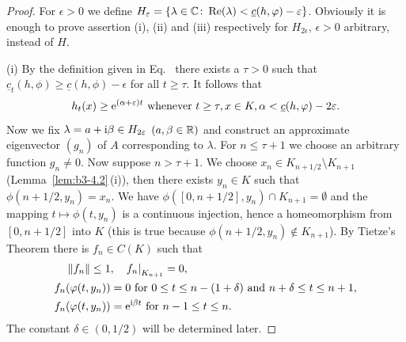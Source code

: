 \begin{proof}
	For $\epsilon > 0$ we define $H_{\epsilon} = \{\lambda \in \C \colon \Re(\lambda) < \underline{c}(h,\phi)-\epsilon\}$.
	Obviously it is enough to prove assertion (i), (ii) and (iii) respectively for $H_{2\epsilon}$, $\epsilon> 0$ arbitrary, instead of\/ $H$.

	(i) By the definition given in Eq.~ there exists a $\tau > 0$ such that $\underline{c}_{t}(h,\phi) \geq \underline{c}(h,\phi) - \epsilon$ for all $t \geq \tau$.
	It follows that
	\begin{equation}\label{eq:b3-4.5}
		h_{t}(x) \geq \eu^{(\alpha + \epsilon)t} \text{ whenever } t \geq \tau, x \in K, \alpha < \underline{c}(h,\phi)-2\epsilon .
	\end{equation}
	Now we fix $\lambda = a + \im\beta \in H_{2\epsilon}$ $(a,\beta \in \mathbb{R})$ and construct an approximate eigenvector $(g_{n})$ of\/ $A$ 
    corresponding to $\lambda$.
	For $n \leq \tau + 1$ we choose an arbitrary function $g_{n} \neq 0$.
	Now suppose $n > \tau + 1$.
	We choose $x_{n} \in K_{n+1/2} \setminus K_{n+1}$ (\cf Lemma~\ref{lem:b3-4.2}\,(i)), then there exists $y_{n} \in K$ such that $\phi(n+1/2,y_{n}) = x_{n}$.
	We have $\phi([0,n+1/2],y_{n}) \cap K_{n+1} = \emptyset$ and the mapping $t \mapsto \phi(t,y_{n})$ is a continuous injection, hence a homeomorphism from $[0,n+1/2]$ into $K$ (this is true because $\phi(n+1/2,y_{n}) \notin K_{n+1}$).
	By Tietze's Theorem there is $f_{n} \in C(K)$ such that
	\begin{equation}\label{eq:b3-4.6}
		\begin{aligned}
			\|f_{n}\| \leq 1 &, \quad {f_{n}|}_{K_{n+1}} = 0 ,  \\
			f_{n}(\phi(t,y_{n})) &= 0 \text{ for } 0 \leq t \leq n-(1+\delta) \text{ and } n+\delta \leq t \leq n+1 ,  \\
			f_{n}(\phi(t,y_{n})) &= \eu^{\im\beta  t} \text{ for } n-1 \leq t \leq n .
		\end{aligned}
	\end{equation}
	The constant $\delta \in (0,1/2)$ will be determined later.
	

\end{proof}
